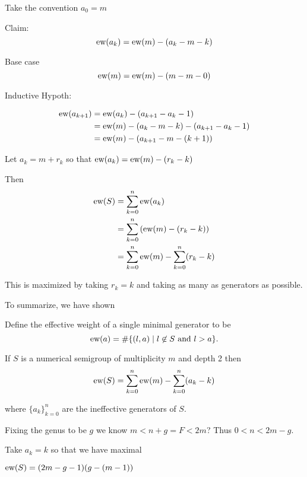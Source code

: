 \documentclass[11pt]{article}
\begin{document}
Take the convention \(a_0 = m\)

Claim: \[\text{ew}(a_k) = \text{ew}(m) - (a_k - m - k)\]

Base case \[\text{ew}(m) = \text{ew}(m) - (m - m - 0)\]

Inductive Hypoth:

\begin{align*}
    \text{ew}(a_{k+1}) &= \text{ew}(a_{k}) - (a_{k+1} - a_k - 1)\\
    &= \text{ew}(m) - (a_k - m - k) - (a_{k+1} - a_k - 1)\\
    &= \text{ew}(m) - (a_{k+1} - m - (k + 1))
\end{align*}


Let \(a_k = m + r_k\) so that \(\text{ew}(a_k) = \text{ew}(m) - (r_k - k)\)

Then
\begin{align*}
\text{ew}(S) &= \sum\limits_{k = 0}^n \text{ew}(a_{k}) \\
&= \sum\limits_{k = 0}^n \left( \text{ew}(m) - (r_k - k) \right) \\
&= \sum\limits_{k = 0}^n \text{ew}(m) - \sum\limits_{k = 0}^n (r_k - k) \\
\end{align*}

This is maximized by taking \(r_k = k\) and taking as many as generators as possible. 

To summarize, we have shown

Define the effective weight of a single minimal generator to be 
\[
\text{ew}(a) = \#\{(l, a) \mid l \not\in S \text{ and } l > a\}.
\]


\begin{proposition}
    If \(S\) is a numerical semigroup of multiplicity \(m\) and depth 2 then 
    \[\text{ew}(S) = \sum\limits_{k = 0}^n \text{ew}(m) - \sum\limits_{k = 0}^n (a_k - k)\]

    where \(\{a_k\}_{k=0}^n\) are the ineffective generators of \(S\).
\end{proposition}

Fixing the genus to be \(g\) we know \(m < n + g = F < 2m\)? Thus \(0 < n < 2m - g\).

Take \(a_k = k\) so that we have maximal

\(\text{ew}(S) = (2m - g - 1)(g - (m -1))\)
\end{document}
